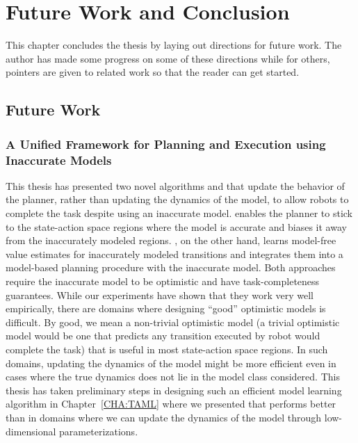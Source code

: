 
\chapter{Future Work and Conclusion}
\label{cha:future-work-concl}

This chapter concludes the thesis by laying out directions for future
work. The author has made some progress on some of these directions
while for others, pointers are given to related work so that the
reader can get started.

\section{Future Work}
\label{sec:future-work}

\subsection{A Unified Framework for Planning and Execution using
  Inaccurate Models}
\label{sec:unified-framework}

This thesis has presented two novel algorithms \cmax{} and \cmaxpp{} that update the
behavior of the planner, rather than updating the dynamics of the
model, to allow robots to complete the task despite using an
inaccurate model. \cmax{} enables the planner to stick to the
state-action space regions where the model is accurate and biases it
away from the inaccurately modeled regions. \cmaxpp{}, on the other
hand, learns model-free value estimates for inaccurately modeled
transitions and integrates them into a model-based planning procedure
with the inaccurate model. Both approaches require the inaccurate
model to be optimistic and have task-completeness guarantees. While
our experiments have shown that they work very well empirically, there
are domains where designing ``good'' optimistic models is
difficult. By good, we mean a non-trivial optimistic model (a trivial
optimistic model would be one that predicts any transition executed by
robot would complete the task) that is useful in most state-action
space regions. In such domains, updating the dynamics of the model
might be more efficient even in cases where the true dynamics does not
lie in the model class considered. This thesis has taken preliminary
steps in designing such an efficient model learning algorithm in
Chapter~\ref{CHA:TAML} where we presented \taml{} that performs better
than \cmax{} in domains where we can update the dynamics of the model
through low-dimensional parameterizations.

